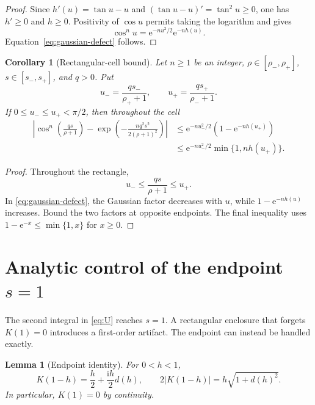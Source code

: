 \documentclass[11pt,a4paper,twoside]{article}
\newcommand{\manualtag}[1]{\tag{#1}}
\newtheorem{lemma}[theorem]{Lemma}
\newtheorem{corollary}[theorem]{Corollary}
\theoremstyle{remark}
\newcommand{\iu}{\mathrm{i}}
\newcommand{\e}{\mathrm{e}}
\newcommand{\abs}[1]{\lvert#1\rvert}
\begin{document}
\begin{proof}
Since \(h'(u)=\tan u-u\) and
\((\tan u-u)'=\tan^2u\ge0\), one has \(h'\ge0\) and \(h\ge0\).
Positivity of \(\cos u\) permits taking the logarithm and gives
\[
 \cos^n u=\e^{-nu^2/2}\e^{-nh(u)}.
\]
Equation~\eqref{eq:gaussian-defect} follows.
\end{proof}

\begin{corollary}[Rectangular-cell bound]\label{cor:gaussian-cell}
Let \(n\ge1\) be an integer,
\(\rho\in[\rho_-,\rho_+]\), \(s\in[s_-,s_+]\), and \(q>0\).  Put
\[
 u_-=\frac{qs_-}{\rho_++1},
 \qquad
 u_+=\frac{qs_+}{\rho_-+1}.
\]
If \(0\le u_-\le u_+<\pi/2\), then throughout the cell
\begin{equation}
\begin{aligned}
 \left|
 \cos^n\!\left(\frac{qs}{\rho+1}\right)
 -
 \exp\!\left(
 -\frac{nq^2s^2}{2(\rho+1)^2}
 \right)
 \right|
 &\le
 \e^{-nu_-^2/2}\left(1-\e^{-nh(u_+)}\right)\\
 &\le
 \e^{-nu_-^2/2}\min\{1,nh(u_+)\}.
\end{aligned}
 \manualtag{28}\label{eq:gaussian-cell}
\end{equation}
\end{corollary}

\begin{proof}
Throughout the rectangle,
\[
 u_-\le\frac{qs}{\rho+1}\le u_+.
\]
In \eqref{eq:gaussian-defect}, the Gaussian factor decreases with \(u\),
while \(1-\e^{-nh(u)}\) increases.  Bound the two factors at opposite
endpoints.  The final inequality uses
\(1-\e^{-x}\le\min\{1,x\}\) for \(x\ge0\).
\end{proof}

\section{Analytic control of the endpoint \texorpdfstring{\(s=1\)}{s=1}}

The second integral in \eqref{eq:U} reaches \(s=1\).  A rectangular
enclosure that forgets \(K(1)=0\) introduces a first-order artifact.
The endpoint can instead be handled exactly.

\begin{lemma}[Endpoint identity]\label{lem:endpoint-identity}
For \(0<h<1\),
\begin{equation}
 K(1-h)=\frac h2+\frac{\iu h}{2}d(h),
 \qquad
 2\abs{K(1-h)}=h\sqrt{1+d(h)^2}.
 \manualtag{29}\label{eq:endpoint-identity}
\end{equation}
In particular, \(K(1)=0\) by continuity.
\end{lemma}
\end{document}
